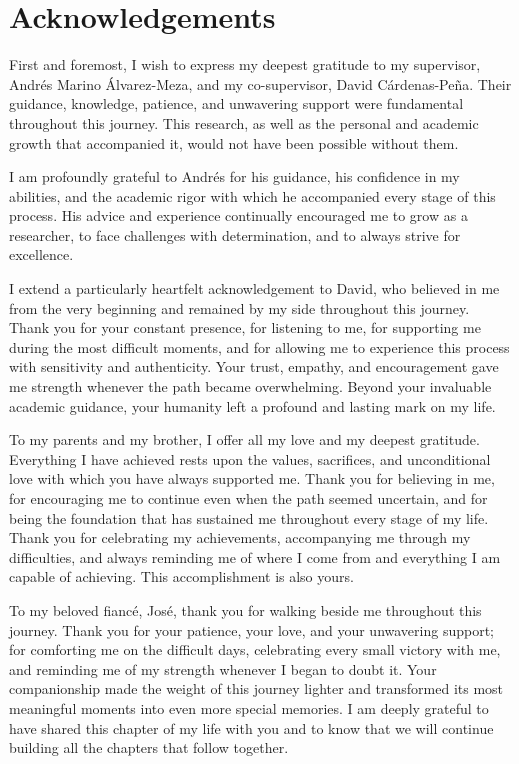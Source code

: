 \chapter*{\sffamily Acknowledgements}

First and foremost, I wish to express my deepest gratitude to my supervisor, Andrés Marino Álvarez-Meza, and my co-supervisor, David Cárdenas-Peña. Their guidance, knowledge, patience, and unwavering support were fundamental throughout this journey. This research, as well as the personal and academic growth that accompanied it, would not have been possible without them.

I am profoundly grateful to Andrés for his guidance, his confidence in my abilities, and the academic rigor with which he accompanied every stage of this process. His advice and experience continually encouraged me to grow as a researcher, to face challenges with determination, and to always strive for excellence.

I extend a particularly heartfelt acknowledgement to David, who believed in me from the very beginning and remained by my side throughout this journey. Thank you for your constant presence, for listening to me, for supporting me during the most difficult moments, and for allowing me to experience this process with sensitivity and authenticity. Your trust, empathy, and encouragement gave me strength whenever the path became overwhelming. Beyond your invaluable academic guidance, your humanity left a profound and lasting mark on my life.

To my parents and my brother, I offer all my love and my deepest gratitude. Everything I have achieved rests upon the values, sacrifices, and unconditional love with which you have always supported me. Thank you for believing in me, for encouraging me to continue even when the path seemed uncertain, and for being the foundation that has sustained me throughout every stage of my life. Thank you for celebrating my achievements, accompanying me through my difficulties, and always reminding me of where I come from and everything I am capable of achieving. This accomplishment is also yours.

To my beloved fiancé, José, thank you for walking beside me throughout this journey. Thank you for your patience, your love, and your unwavering support; for comforting me on the difficult days, celebrating every small victory with me, and reminding me of my strength whenever I began to doubt it. Your companionship made the weight of this journey lighter and transformed its most meaningful moments into even more special memories. I am deeply grateful to have shared this chapter of my life with you and to know that we will continue building all the chapters that follow together.


